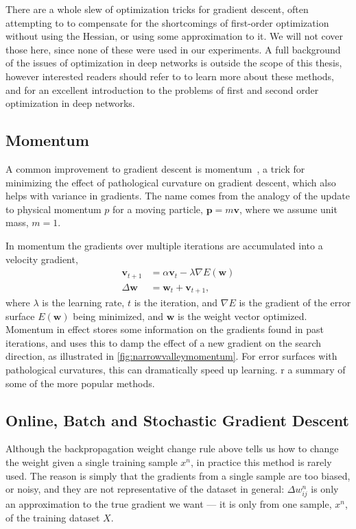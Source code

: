 \documentclass[thesis]{subfiles}
\begin{document}
There are a whole slew of optimization tricks for gradient descent, often attempting to to compensate for the shortcomings of first-order optimization without using the Hessian, or using some approximation to it. We will not cover those here, since none of these were used in our experiments. A full background of the issues of optimization in deep networks is outside the scope of this thesis, however interested readers should refer to \citet{goodfellow2016deep} to learn more about these methods, and \citet{martens2010deep} for an excellent introduction to the problems of first and second order optimization in deep networks.

\subsection{Momentum}
A common improvement to gradient descent is momentum~\citep{polyak1964some,rumelhartbackprop}, a trick for minimizing the effect of pathological curvature on gradient descent, which also helps with variance in gradients. The name comes from the analogy of the update to physical momentum $p$ for a moving particle, $\mathbf{p}=m\mathbf{v}$, where we assume unit mass, $m=1$.

In momentum the gradients over multiple iterations are accumulated into a velocity gradient, 
\begin{equation}
\begin{aligned}
\mathbf{v}_{t+1} &= \alpha \mathbf{v}_t - \lambda\nabla E(\mathbf{w})\\
\Delta\mathbf{w} &= \mathbf{w}_t + \mathbf{v}_{t+1},
\end{aligned}
\end{equation}
where $\lambda$ is the learning rate, $t$ is the iteration, and $\nabla E$ is the gradient of the error surface $E(\mathbf{w})$ being minimized, and $\mathbf{w}$ is the weight vector optimized. Momentum in effect stores some information on the gradients found in past iterations, and uses this to damp the effect of a new gradient on the search direction, as illustrated in \cref{fig:narrowvalleymomentum}. For error surfaces with pathological curvatures, this can dramatically speed up learning.
r a summary of some of the more popular methods.

\subsection{Online, Batch and Stochastic Gradient Descent}
Although the backpropagation weight change rule above tells us how to change the weight given a single training sample $x^n$, in practice this method is rarely used. The reason is simply that the gradients from a single sample are too biased, or noisy, and they are not representative of the dataset in general: $\Delta w^n_{ij}$ is only an approximation to the true gradient we want --- it is only from one sample, $x^n$, of the training dataset $X$. 
\end{document}
